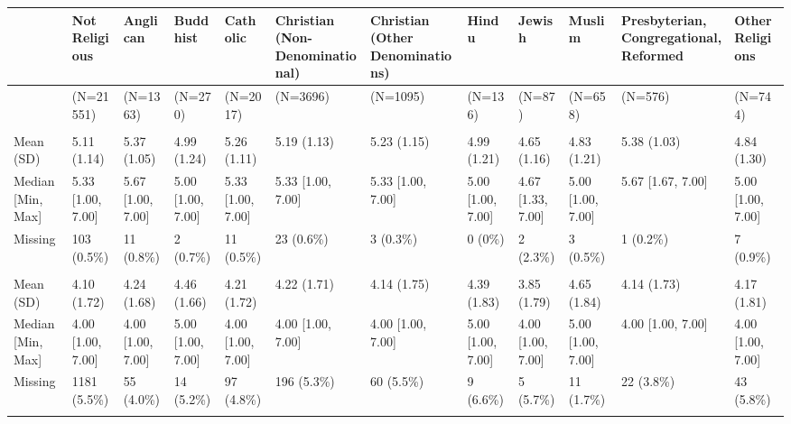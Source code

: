 \documentclass[
  single column]{article}
\begin{document}
\begin{landscape}



\begin{tabular}[t]{llllllllllll}
\toprule
  & Not Religious & Anglican & Buddhist & Catholic & Christian (Non-Denominational) & Christian (Other Denominations) & Hindu & Jewish & Muslim & Presbyterian, Congregational, Reformed & Other Religions\\
\midrule
 & (N=21551) & (N=1363) & (N=270) & (N=2017) & (N=3696) & (N=1095) & (N=136) & (N=87) & (N=658) & (N=576) & (N=744)\\
\addlinespace[0.3em]
\multicolumn{12}{l}{\textbf{Sense of Belonging}}\\
\hspace{1em}Mean (SD) & 5.11 (1.14) & 5.37 (1.05) & 4.99 (1.24) & 5.26 (1.11) & 5.19 (1.13) & 5.23 (1.15) & 4.99 (1.21) & 4.65 (1.16) & 4.83 (1.21) & 5.38 (1.03) & 4.84 (1.30)\\
\hspace{1em}Median [Min, Max] & 5.33 [1.00, 7.00] & 5.67 [1.00, 7.00] & 5.00 [1.00, 7.00] & 5.33 [1.00, 7.00] & 5.33 [1.00, 7.00] & 5.33 [1.00, 7.00] & 5.00 [1.00, 7.00] & 4.67 [1.33, 7.00] & 5.00 [1.00, 7.00] & 5.67 [1.67, 7.00] & 5.00 [1.00, 7.00]\\
\hspace{1em}Missing & 103 (0.5\%) & 11 (0.8\%) & 2 (0.7\%) & 11 (0.5\%) & 23 (0.6\%) & 3 (0.3\%) & 0 (0\%) & 2 (2.3\%) & 3 (0.5\%) & 1 (0.2\%) & 7 (0.9\%)\\
\addlinespace[0.3em]
\multicolumn{12}{l}{\textbf{bodysat}}\\
\hspace{1em}Mean (SD) & 4.10 (1.72) & 4.24 (1.68) & 4.46 (1.66) & 4.21 (1.72) & 4.22 (1.71) & 4.14 (1.75) & 4.39 (1.83) & 3.85 (1.79) & 4.65 (1.84) & 4.14 (1.73) & 4.17 (1.81)\\
\hspace{1em}Median [Min, Max] & 4.00 [1.00, 7.00] & 4.00 [1.00, 7.00] & 5.00 [1.00, 7.00] & 4.00 [1.00, 7.00] & 4.00 [1.00, 7.00] & 4.00 [1.00, 7.00] & 5.00 [1.00, 7.00] & 4.00 [1.00, 7.00] & 5.00 [1.00, 7.00] & 4.00 [1.00, 7.00] & 4.00 [1.00, 7.00]\\
\hspace{1em}Missing & 1181 (5.5\%) & 55 (4.0\%) & 14 (5.2\%) & 97 (4.8\%) & 196 (5.3\%) & 60 (5.5\%) & 9 (6.6\%) & 5 (5.7\%) & 11 (1.7\%) & 22 (3.8\%) & 43 (5.8\%)\\
\addlinespace[0.3em]
\multicolumn{12}{l}{\textbf{forgiveness}}\\

\end{tabular}
\end{landscape}
\end{document}
